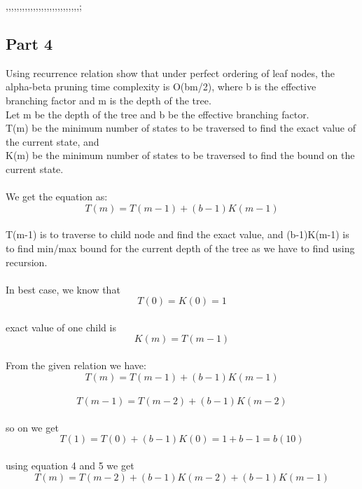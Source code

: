 ,,,,,,,,,,,,,,,,,,,,,,,,,,,;\documentclass[conference]{IEEEtran}
\begin{document}
\subsection{Part 4}
Using recurrence relation show that under perfect ordering of leaf nodes, the alpha-beta pruning time complexity is O(bm/2), where b is the effective branching factor and m is the depth of the tree.
\\
Let m be the depth of the tree and b be the effective
branching factor.
\\
T(m) be the minimum number of states to be traversed to
find the exact value of the current state, and
\\
K(m) be the minimum number of states to be traversed to
find the bound on the current state.
\\
\\
We get the equation as:
\begin{equation}
T(m)=T(m-1)+(b-1)K(m-1)\label{eq}
\end{equation}
\\
T(m-1) is to traverse to child node and find the
exact value, and (b-1)K(m-1) is to find min/max bound for
the current depth of the tree as we have to find using recursion.
\\
\\
In best case, we know that
\\
\begin{equation}
T(0) = K(0) = 1\label{eq}
\end{equation}
\\
exact value of one child is
\begin{equation}
K(m)=T(m−1)\label{eq}
\end{equation}
\\
From the given relation we have:
\\
\begin{equation}
T(m) = T(m−1) + (b−1)K(m−1)\label{eq}
\end{equation}
\\
\begin{equation}
T(m−1) = T(m-2) + (b−1)K(m−2)\label{eq}
\end{equation}
\\
so on we get 
\\
\begin{equation}
T(1) = T(0) + (b-1)K(0) = 1 + b-1 = b(10)\label{eq}
\end{equation}
\\
using equation 4 and 5 we get
\\
\begin{equation}
T(m) = T(m−2)+(b−1)K(m−2)+(b−1)K(m−1) \label{eq}
\end{equation}
\end{document}
